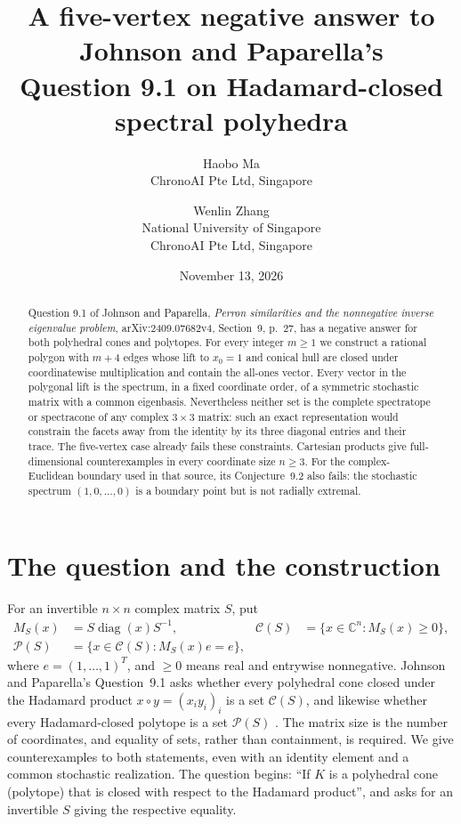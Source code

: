 \documentclass[11pt,a4paper]{article}
\title{A five-vertex negative answer to Johnson and Paparella's\protect\\
Question 9.1 on Hadamard-closed spectral polyhedra}
\author{Haobo Ma\\{\small ChronoAI Pte Ltd, Singapore}
\and Wenlin Zhang\\{\small National University of Singapore}\\
{\small ChronoAI Pte Ltd, Singapore}}
\date{November 13, 2026}
\newcommand{\C}{\mathbb C}
\newcommand{\diag}{\operatorname{diag}}
\begin{document}
\maketitle
\begin{abstract}
Question 9.1 of Johnson and Paparella, \emph{Perron similarities and the
nonnegative inverse eigenvalue problem}, arXiv:2409.07682v4, Section~9,
p.~27, has a negative answer for both polyhedral cones and polytopes.
For every integer $m\geq1$ we construct a rational polygon with $m+4$ edges
whose lift to $x_0=1$ and conical hull are closed under coordinatewise
multiplication and contain the all-ones vector. Every vector in the polygonal
lift is the spectrum, in a fixed coordinate order, of a symmetric stochastic
matrix with a common eigenbasis. Nevertheless neither set is the complete
spectratope or spectracone of any complex $3\times3$ matrix: such an exact
representation would constrain the facets away from the identity by its
three diagonal entries and their trace. The five-vertex case already fails
these constraints. Cartesian products give full-dimensional counterexamples
in every coordinate size $n\geq3$. For the complex-Euclidean boundary
used in that source, its Conjecture~9.2 also fails: the stochastic spectrum
$(1,0,\ldots,0)$ is a boundary point but is not radially extremal.
\end{abstract}

\section{The question and the construction}
For an invertible $n\times n$ complex matrix $S$, put
\begin{align*}
 M_S(x)&=S\diag(x)S^{-1},&
 \mathcal C(S)&=\{x\in\C^n:M_S(x)\geq0\},\\
 \mathcal P(S)&=\{x\in\mathcal C(S):M_S(x)e=e\},
\end{align*}
where $e=(1,\ldots,1)^T$, and $\geq0$ means real and entrywise
nonnegative. Johnson and Paparella's Question~9.1 asks whether every
polyhedral cone closed under the Hadamard product $x\circ y=(x_i y_i)_i$
is a set $\mathcal C(S)$, and likewise whether every Hadamard-closed
polytope is a set $\mathcal P(S)$ \cite[p.~27]{JP25}.
The matrix size is the number of coordinates, and equality of sets, rather
than containment, is required. We give counterexamples to both statements,
even with an identity element and a common stochastic realization.
The question begins: ``If $K$ is a polyhedral cone (polytope) that is closed
with respect to the Hadamard product'', and asks for an invertible $S$
giving the respective equality.
\end{document}
